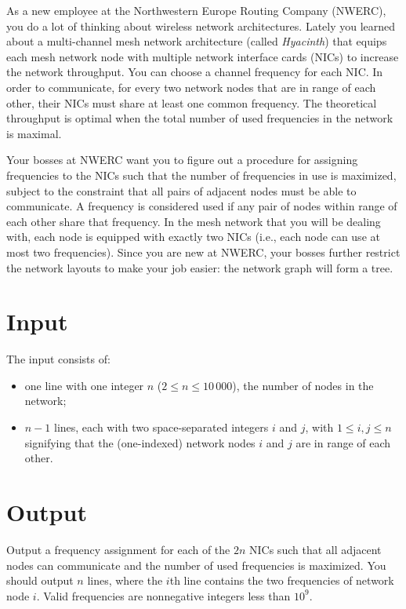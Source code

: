 
%
\noindent
As a new employee at the Northwestern Europe Routing Company (NWERC), you do a
lot of thinking about wireless network architectures. Lately you learned
about a multi-channel mesh network architecture (called
\emph{Hyacinth}) that equips each mesh network node with multiple network
interface cards (NICs) to increase the network throughput.
You can choose a channel frequency for each NIC. In order to communicate,
for every two network nodes that are in range of each other, their NICs
must share at least one common frequency.
The theoretical throughput is optimal when the total number of used frequencies
in the network is maximal.

Your bosses at NWERC want you to figure out a procedure for assigning
frequencies to the NICs such that the number of frequencies in use is
maximized, subject to the constraint that all pairs of adjacent nodes must be able to communicate.  A frequency is considered used if any pair of nodes within range
of each other share that frequency.  In the mesh network that you will be dealing with, each node is equipped with exactly two NICs (i.e., each node can use at most
two frequencies). Since you are new at NWERC, your bosses further restrict the
network layouts to make your job easier: the network graph will form a tree.

\section*{Input}

The input consists of:
\begin{itemize}
\item one line with one integer $n$ ($2 \leq n \leq 10\,000$), the number of nodes in the network;
\item $n-1$ lines, each with two space-separated integers $i$ and $j$, with $1 \leq i,j \leq n$ signifying that the (one-indexed) network nodes $i$ and $j$ are in range of each other.
\end{itemize}

\section*{Output}

Output a frequency assignment for each of the $2n$ NICs such that all
adjacent nodes can communicate and the number of used frequencies is
maximized.  You should output $n$ lines, where the $i$th line contains the
two frequencies of network node $i$. Valid frequencies are nonnegative
integers less than $10^9$.
